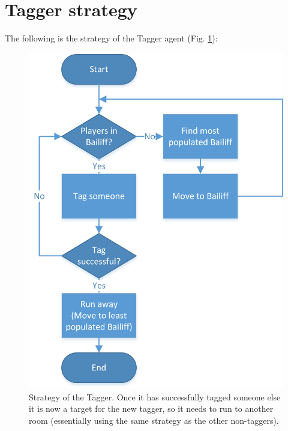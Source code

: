 \documentclass[conference, a4paper]{IEEEtran}
\begin{document}
\section{Tagger strategy}
The following is the strategy of the Tagger agent (Fig. \ref{tagger-strategy}):
\begin{figure}[h!]
	\centering
	\includegraphics[scale=0.9]{tagger-strategy}
	\caption{Strategy of the Tagger. Once it has successfully tagged someone else it is now a target for the new tagger, so it needs to run to another room (essentially using the same strategy as the other non-taggers).}
	\label{tagger-strategy}
\end{figure}
\end{document}
